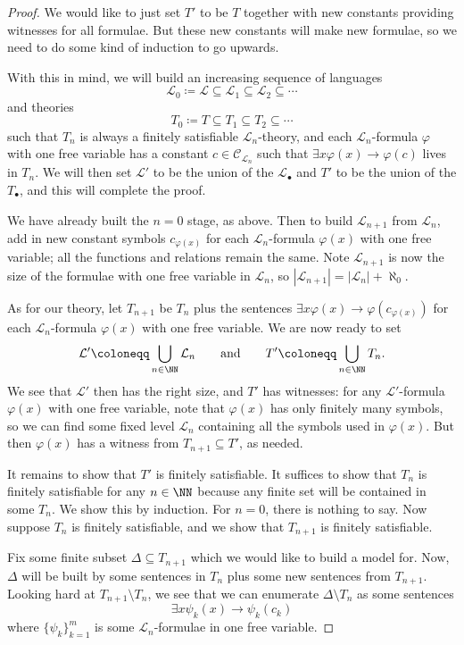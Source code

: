 \documentclass[../notes.tex]{subfiles}
\begin{document}
\begin{proof}
	We would like to just set $T'$ to be $T$ together with new constants providing witnesses for all formulae. But these new constants will make new formulae, so we need to do some kind of induction to go upwards.

	With this in mind, we will build an increasing sequence of languages
	\[\mathcal L_0\coloneqq\mathcal L\subseteq\mathcal L_1\subseteq\mathcal L_2\subseteq\cdots\]
	and theories
	\[T_0\coloneqq T\subseteq T_1\subseteq T_2\subseteq\cdots\]
	such that $T_n$ is always a finitely satisfiable $\mathcal L_n$-theory, and each $\mathcal L_n$-formula $\varphi$ with one free variable has a constant $c\in\mathcal C_{\mathcal L_n}$ such that $\exists x\varphi(x)\to\varphi(c)$ lives in $T_n$. We will then set $\mathcal L'$ to be the union of the $\mathcal L_\bullet$ and $T'$ to be the union of the $T_\bullet$, and this will complete the proof.

	We have already built the $n=0$ stage, as above. Then to build $\mathcal L_{n+1}$ from $\mathcal L_n$, add in new constant symbols $c_{\varphi(x)}$ for each $\mathcal L_n$-formula $\varphi(x)$ with one free variable; all the functions and relations remain the same. Note $\mathcal L_{n+1}$ is now the size of the formulae with one free variable in $\mathcal L_n$, so $\left|\mathcal L_{n+1}\right|=\left|\mathcal L_n\right|+\aleph_0$.

	As for our theory, let $T_{n+1}$ be $T_n$ plus the sentences $\exists x\varphi(x)\to\varphi\left(c_{\varphi(x)}\right)$ for each $\mathcal L_n$-formula $\varphi(x)$ with one free variable. We are now ready to set
	\[\mathcal L'\coloneqq\bigcup_{n\in\NN}\mathcal L_n\qquad\text{and}\qquad T'\coloneqq\bigcup_{n\in\NN}T_n.\]
	We see that $\mathcal L'$ then has the right size, and $T'$ has witnesses: for any $\mathcal L'$-formula $\varphi(x)$ with one free variable, note that $\varphi(x)$ has only finitely many symbols, so we can find some fixed level $\mathcal L_n$ containing all the symbols used in $\varphi(x)$. But then $\varphi(x)$ has a witness from $T_{n+1}\subseteq T'$, as needed.

	It remains to show that $T'$ is finitely satisfiable. It suffices to show that $T_n$ is finitely satisfiable for any $n\in\NN$ because any finite set will be contained in some $T_n$. We show this by induction. For $n=0$, there is nothing to say. Now suppose $T_n$ is finitely satisfiable, and we show that $T_{n+1}$ is finitely satisfiable.
	
	Fix some finite subset $\Delta\subseteq T_{n+1}$ which we would like to build a model for. Now, $\Delta$ will be built by some sentences in $T_n$ plus some new sentences from $T_{n+1}$. Looking hard at $T_{n+1}\setminus T_n$, we see that we can enumerate $\Delta\setminus T_n$ as some sentences
	\[\exists x\psi_k(x)\to \psi_k(c_k)\]
	where $\{\psi_k\}_{k=1}^m$ is some $\mathcal L_n$-formulae in one free variable.
	

\end{proof}
\end{document}
